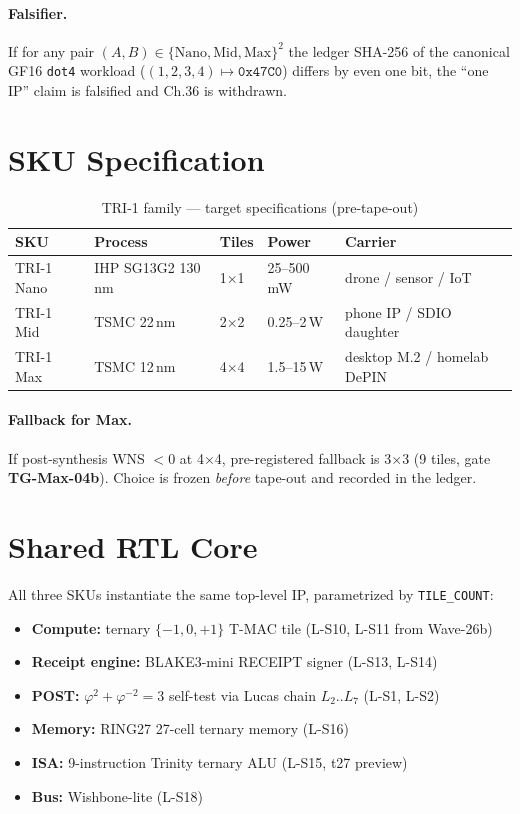\paragraph{Falsifier.}
If for any pair $(A,B) \in \{\text{Nano},\text{Mid},\text{Max}\}^2$ the
ledger SHA-256 of the canonical GF16 \texttt{dot4} workload
($(1,2,3,4) \mapsto \mathtt{0x47C0}$) differs by even one bit, the
\enquote{one IP} claim is falsified and Ch.36 is withdrawn.

\section{SKU Specification}
\label{sec:36:sku}

\begin{table}[H]
\centering
\caption{TRI-1 family --- target specifications (pre-tape-out)}
\label{tab:36:sku}
\small
\begin{tabular}{lllll}
\toprule
SKU & Process & Tiles & Power & Carrier \\
\midrule
TRI-1 Nano & IHP SG13G2 130\,nm & 1$\times$1 & 25--500\,mW & drone / sensor / IoT \\
TRI-1 Mid  & TSMC 22\,nm        & 2$\times$2 & 0.25--2\,W & phone IP / SDIO daughter \\
TRI-1 Max  & TSMC 12\,nm        & 4$\times$4 & 1.5--15\,W & desktop M.2 / homelab DePIN \\
\bottomrule
\end{tabular}
\end{table}

\paragraph{Fallback for Max.}
If post-synthesis WNS $< 0$ at 4$\times$4, pre-registered fallback is
3$\times$3 (9 tiles, gate \textbf{TG-Max-04b}). Choice is frozen \emph{before}
tape-out and recorded in the ledger.

\section{Shared RTL Core}
\label{sec:36:rtl-core}

All three SKUs instantiate the same top-level IP, parametrized by
\verb|TILE_COUNT|:

\begin{itemize}
  \item \textbf{Compute:} ternary $\{-1,0,+1\}$ T-MAC tile (L-S10, L-S11 from Wave-26b)
  \item \textbf{Receipt engine:} BLAKE3-mini RECEIPT signer (L-S13, L-S14)
  \item \textbf{POST:} $\varphi^2 + \varphi^{-2} = 3$ self-test via Lucas chain $L_2..L_7$ (L-S1, L-S2)
  \item \textbf{Memory:} RING27 27-cell ternary memory (L-S16)
  \item \textbf{ISA:} 9-instruction Trinity ternary ALU (L-S15, t27 preview)
  \item \textbf{Bus:} Wishbone-lite (L-S18)
\end{itemize}

